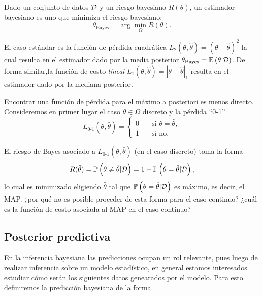 \begin{definition}
Dado un conjunto de datos ${\mathcal D}$ y un riesgo bayesiano $R(\theta)$, un estimador bayesiano es uno que minimiza el riesgo bayesiano:
\begin{equation}
    \theta_\text{Bayes} = \arg\min_{\Omega} R(\theta).
\end{equation}
\end{definition}

\begin{example}
El  caso estándar es la función de pérdida cuadrática $L_2(\theta,\hat\theta) = (\theta-\hat\theta)^2$ la cual resulta en el estimador dado por la media posterior $\theta_\text{Bayes} = \mathbb{E} \left(\theta|{\mathcal D}\right)$. De forma similar,la función de costo \emph{lineal} $L_1(\theta,\hat\theta) = |\theta-\hat\theta|_1$ resulta en el estimador dado por la mediana posterior. 
\end{example}

Encontrar una función de pérdida para el máximo a posteriori es menos directo. Consideremos en primer lugar el caso $\theta\in\Omega$ discreto y la pérdida ``0-1''
\[   
L_\text{0-1}(\theta,\hat\theta) = 
     \begin{cases}
       0 &\quad\text{si } \theta = \hat\theta,\\
       1 &\quad\text{si no}. 
     \end{cases}
\]

El riesgo de Bayes asociado a $L_\text{0-1}(\theta,\hat\theta)$ (en el caso discreto) toma la forma
\begin{equation}
    R(\hat\theta) = \mathbb{P} \left(\theta\neq\hat\theta|{\mathcal D}\right) = 1-\mathbb{P} \left(\theta = \hat\theta|{\mathcal D}\right),
\end{equation}
lo cual es minimizado eligiendo $\hat\theta$ tal que $\mathbb{P} \left(\theta = \hat\theta|{\mathcal D}\right)$ es máximo, es decir, el MAP. ¿por qué no es posible proceder de esta forma para el caso continuo? ¿cuál es la función de costo asociada al MAP en el caso continuo?




\subsection{Posterior predictiva}

En la inferencia bayesiana las predicciones ocupan un rol relevante, pues luego de realizar inferencia sobre un modelo estadístico, en general estamos interesados estudiar cómo serán los siguientes datos genearados por el modelo. Para esto definiremos la predicción bayesiana de la forma


